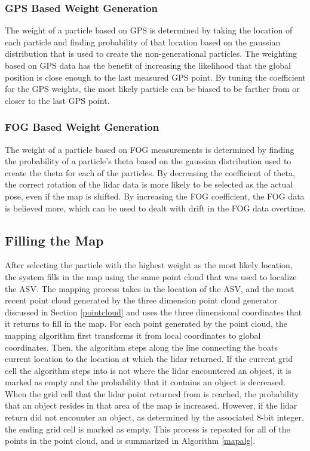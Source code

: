 \documentclass[10pt]{IEEEtran}
\begin{document}
\subsubsection{GPS Based Weight Generation}
The weight of a particle based on GPS is determined by taking the location of each particle
and finding probability of that location based on the gaussian distribution that is used to 
create the non-generational particles.  The weighting based on GPS data has the benefit of 
increasing the likelihood that the global position is close enough to the last measured GPS 
point.  By tuning the coefficient for the GPS weights, the most likely particle can be biased
to be farther from or closer to the last GPS point.

\subsubsection{FOG Based Weight Generation}
The weight of a particle based on FOG measurements is determined by finding the probability
of a particle's theta based on the gaussian distribution used to create the theta for each of
the particles.  By decreasing the coefficient of theta, the correct rotation of the lidar
data is more likely to be selected as the actual pose, even if the map is shifted.  
By increasing the FOG coefficient, the FOG data is believed more, which can be used to dealt 
with drift in the FOG data overtime.

\subsection{Filling the Map}
After selecting the particle with the highest weight as the most likely location, the system
fills in the map using the same point cloud that was used to localize the ASV.
The mapping process takes in the location of the ASV, and the most recent point
cloud generated by the three dimension point cloud generator discussed in Section
\ref{pointcloud} and uses the three dimensional coordinates that it returns to fill in the 
map.  For each point generated by the point cloud, the mapping algorithm first transforms
it from local coordinates to global coordinates.  Then, the algorithm steps along the line
connecting the boats current location to the location at which the lidar returned.  If the
current grid cell the algorithm steps into is not where the lidar encountered an object,
it is marked as empty and the probability that it contains an object is decreased.  When
the grid cell that the lidar point returned from is reached, the probability
that an object resides in that area of the map is increased.  However, if the lidar return
did not encounter an object, as determined by the associated 8-bit integer, the ending grid
cell is marked as empty.  This process is repeated for all of the points in the point cloud,
and is summarized in Algorithm \ref{mapalg}.
\end{document}
